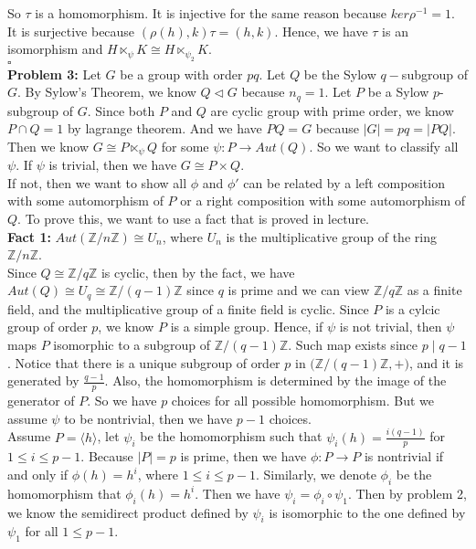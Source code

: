 \documentclass[12pt]{amsart}
\newcommand{\Z}{\mathbb{Z}}
\newcommand{\normal}{\triangleleft}
\begin{document}
So $\tau$ is a homomorphism. It is injective for the same reason because $ker\rho^{-1}=1$. It is surjective because $(\rho(h),k)\tau=(h,k)$. Hence, we have $\tau$ is an isomorphism and $H\ltimes_\psi K\cong H\ltimes_{\psi_2} K$.
\\\phantom{qed}\hfill$\square$\\
\textbf{Problem 3:} Let $G$ be a group with order $pq$. Let $Q$ be the Sylow $q-$subgroup of $G$. By Sylow's Theorem, we know $Q\normal G$ because $n_q=1$. Let $P$ be a Sylow $p$-subgroup of $G$. Since both $P$ and $Q$ are cyclic group with prime order, we know $P\cap Q=1$ by lagrange theorem. And we have $PQ=G$ because $|G|=pq=|PQ|$. Then we know $G\cong P\ltimes_\psi Q$ for some $\psi: P\to Aut(Q)$. So we want to classify all $\psi$. If $\psi$ is trivial, then we have $G\cong P\times Q$.\\
If not, then we want to show all $\phi$ and $\phi'$ can be related by a left composition with some automorphism of $P$ or a right composition with some automorphism of $Q$. To prove this, we want to use a fact that is proved in lecture.\\
\textbf{Fact 1:} $Aut(\Z/n\Z)\cong U_n$, where $U_n$ is the multiplicative group of the ring $\Z/n\Z$.\\
Since $Q\cong \Z/q\Z$ is cyclic, then by the fact, we have $Aut(Q)\cong U_q\cong \Z/(q-1)\Z$ since $q$ is prime and we can view $\Z/q\Z$ as a finite field, and the multiplicative group of a finite field is cyclic. Since $P$ is a cylcic group of order $p$, we know $P$ is a simple group. Hence, if $\psi$ is not trivial, then $\psi$ maps $P$ isomorphic to a subgroup of $\Z/(q-1)\Z$. Such map exists since $p\mid q-1$. Notice that there is a unique subgroup of order $p$ in $\big(\Z/(q-1)\Z,+\big)$, and it is generated by $\frac{q-1}{p}$. Also, the homomorphism is determined by the image of the generator of $P$. So we have $p$ choices for all possible homomorphism. But we assume $\psi$ to be nontrivial, then we have $p-1$ choices.\\
Assume $P=\langle h\rangle$, let $\psi_i$ be the homomorphism such that $\psi_i(h)=\frac{i(q-1)}{p}$ for $1\leq i\leq p-1$. Because $|P|=p$ is prime, then we have $\phi:P\to P$ is nontrivial if and only if $\phi(h)=h^i$, where $1\leq i\leq p-1$. Similarly, we denote $\phi_i$ be the homomorphism that $\phi_i(h)=h^i$. Then we have $\psi_i=\phi_i\circ \psi_1$. Then by problem 2, we know the semidirect product defined by $\psi_i$ is isomorphic to the one defined by $\psi_1$ for all $1\leq p-1$.\\
\end{document}

